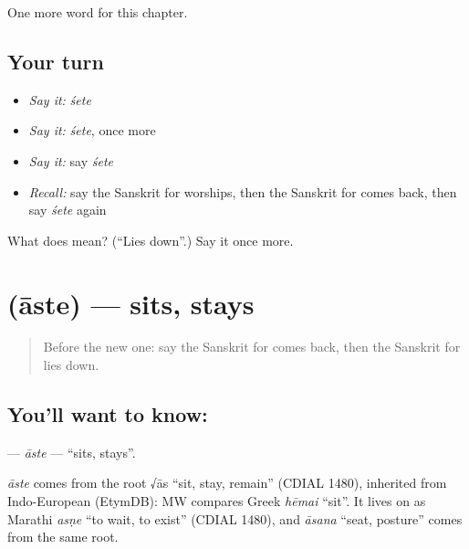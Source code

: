 \begin{grammarlens}[title={What you've built}]
One more word for this chapter.
\end{grammarlens}

\subsection*{Your turn}
\begin{itemize}
\raggedright
  \item \emph{Say it:} \emph{śete}
  \item \emph{Say it:} \emph{śete}, once more
  \item \emph{Say it:} say \emph{śete}
  \item \emph{Recall:} say the Sanskrit for worships, then the Sanskrit for comes back, then say \emph{śete} again
\end{itemize}

\begin{tcolorbox}[breakable,colback=teal!4,colframe=teal!35!black,title={Before you move on}]
What does  mean? (\textquotedblleft{}Lies down\textquotedblright{}.) Say it once more.
\end{tcolorbox}
\section[\texorpdfstring{\sk{आस्ते} (āste)}{आस्ते (āste)}]{ (āste) — sits, stays}

\label{lesson:SA-C143-aste}



\begin{quote}
Before the new one: say the Sanskrit for comes back, then the Sanskrit for lies down.
\end{quote}

\subsection*{You'll want to know: }
\textbf{} — \emph{āste} — \textquotedblleft{}sits, stays\textquotedblright{}.

\begin{cousinweb}
\emph{āste} comes from the root √ās \textquotedblleft{}sit, stay, remain\textquotedblright{} (CDIAL 1480), inherited from Indo-European (EtymDB): MW compares Greek \emph{hēmai} \textquotedblleft{}sit\textquotedblright{}. It lives on as Marathi \emph{asṇe} \textquotedblleft{}to wait, to exist\textquotedblright{} (CDIAL 1480), and \emph{āsana} \textquotedblleft{}seat, posture\textquotedblright{} comes from the same root.
\end{cousinweb}

